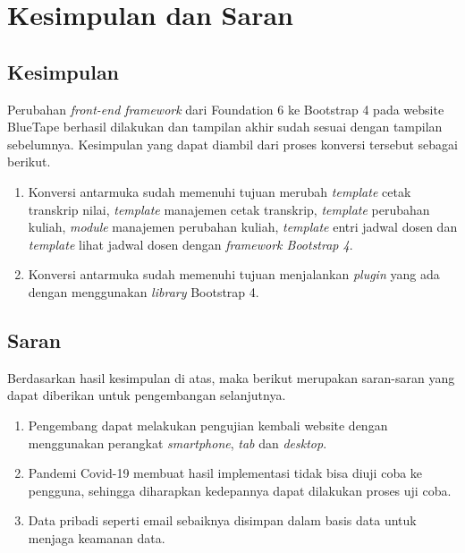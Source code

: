 \chapter{Kesimpulan dan Saran}
\section{Kesimpulan}
Perubahan \textit{front-end framework} dari Foundation 6 ke Bootstrap 4 pada website BlueTape berhasil dilakukan dan tampilan akhir sudah sesuai dengan tampilan sebelumnya. Kesimpulan yang dapat diambil dari proses konversi tersebut sebagai berikut. 
\begin{enumerate}
	\item Konversi antarmuka sudah memenuhi tujuan merubah \textit{template} cetak transkrip nilai, \textit{template} manajemen cetak transkrip, \textit{template} perubahan kuliah, \textit{module} manajemen perubahan kuliah, \textit{template} entri jadwal dosen dan \textit{template} lihat jadwal dosen dengan \textit{framework Bootstrap 4}.
	\item Konversi antarmuka sudah memenuhi tujuan menjalankan \textit{plugin} yang ada dengan menggunakan \textit{library} Bootstrap 4.
\end{enumerate}


\section{Saran}
Berdasarkan hasil kesimpulan di atas, maka berikut merupakan saran-saran yang dapat diberikan untuk pengembangan selanjutnya.
\begin{enumerate}
	\item Pengembang dapat melakukan pengujian kembali website dengan menggunakan perangkat \textit{smartphone}, \textit{tab} dan \textit{desktop}.		
	\item Pandemi Covid-19 membuat hasil implementasi tidak bisa diuji coba ke pengguna, sehingga diharapkan kedepannya dapat dilakukan proses uji coba.
	\item Data pribadi seperti email sebaiknya disimpan dalam basis data untuk menjaga keamanan data.
\end{enumerate}